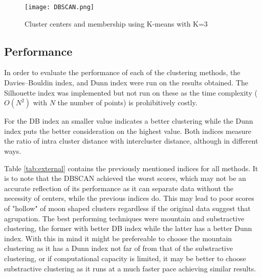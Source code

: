\begin{figure*}[t]
    \texttt{[image: DBSCAN.png]}
    \caption{Cluster centers and membership using K-means with K=3
    \label{fig:dbscan}}
\end{figure*}

\subsection{Performance}
In order to evaluate the performance of each of the clustering methods, the 
Davies–Bouldin index, and Dunn index were run on the results obtained. The
Silhouette index was implemented but not run on these as the time complexity
($O(N^2)$ with $N$ the number of points) is prohibitively costly. 

For the DB index an smaller value indicates a better clustering while the Dunn
index puts the better consideration on the highest value. Both indices measure
the ratio of intra cluster distance with intercluster distance, although in 
different ways.

Table \ref{tab:external} contains the previously mentioned indices for all
methods. It is to note that the DBSCAN achieved the worst scores, which may not
be an accurate reflection of its performance as it can separate data without the
necessity of centers, while the previous indices do. This may lead to poor
scores of "hollow" of moon shaped clusters regardless if the original data
suggest that agrupation. The best performing techniques were mountain and
substractive clustering, the former with better DB index while the latter has a
better Dunn index. With this in mind it might be prefereable to choose the
mountain clustering as it has a Dunn index not far of from that of the
substractive clustering, or if computational capacity is limited, it may be
better to choose substractive clustering as it runs at a much faster pace
achieving similar results.

